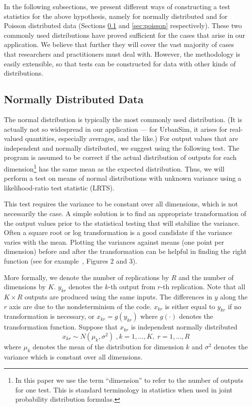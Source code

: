 \documentclass{sig-alternate}
\begin{document}
\newpage

In the following subsections, we present different ways of constructing a test
statistics for the above hypothesis, namely for normally distributed and for
Poisson distributed data (Sections \ref{sec:normal} and \ref{sec:poisson}
respectively).  These two commonly used distributions have proved sufficient
for the cases that arise in our application.  We believe that further they
will cover the vast majority of cases that researchers and practitioners must
deal with.  However, the methodology is easily extensible, so that tests can
be constructed for data with other kinds of distributions.

%
\subsection{Normally Distributed Data}
\label{sec:normal}
%
The normal distribution is typically the most commonly used distribution. (It
is actually not so widespread in our application --- for UrbanSim, it arises
for real-valued quantities, especially averages, and the like.)  For output
values that are independent and normally distributed, we suggest using the
following test.  The program is assumed to be correct if the
actual distribution of outputs for each dimension\footnote{In this paper we
  use the term ``dimension'' to refer to the number of outputs for one test.
  This is standard terminology in statistics when used in joint probability
  distribution formulas.}  has the same mean as the expected distribution.
Thus, we will perform a test on means of normal distributions with unknown
variance using a likelihood-ratio test statistic (LRTS).

This test requires the variance to be constant over all dimensions, which is not
necessarily the case. A simple solution is to find an appropriate
transformation of the output values prior to the statistical testing that will
stabilize the variance. Often a square root or log transformation is a good
candidate if the variance varies with the mean.  Plotting the variances
against means (one point per dimension) before and after the transformation
can be helpful in finding the right function (see for
example~\cite{sevcikova-trb-2006}, Figures 2 and 3).

More formally, we denote the number of replications by $R$ and the number of
dimensions by $K$\@. $y_{kr}$ denotes the $k$-th output from $r$-th
replication.  Note that all $K \times R$ outputs are produced using the same
inputs. The differences in $y$ along the $r$ axis are due to the
nondeterminism of the code. $x_{kr}$ is either equal to $y_{kr}$ if no
transformation is necessary, or $x_{kr} = g(y_{kr})$ where $g(\cdot)$ denotes
the transformation function.  Suppose that $x_{kr}$ is independent normally
distributed
\[
x_{kr} \sim N(\mu_k, \sigma^2)\;, k=1,\dots, K,\; r=1,\dots,R
\]
where $\mu_k$ denotes the mean of the distribution for dimension $k$
and $\sigma^2$ denotes the variance which is constant over all dimensions.
\end{document}
